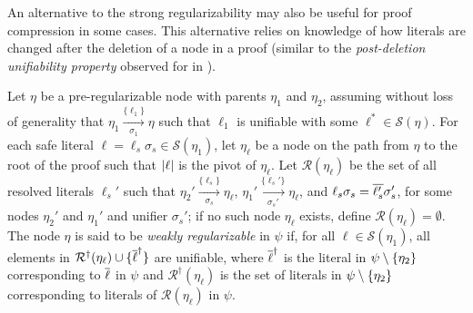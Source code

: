 An alternative to the strong regularizability may also be useful for proof compression in some cases. This alternative relies on knowledge of how literals are changed after the deletion of a node in a proof (similar to the \emph{post-deletion unifiability property} observed for {\FOLowerUnits} in \cite{GFOLU}).  
\begin{definition}\label{def:postdelprop}
Let $\eta$ be a pre-regularizable node with parents $\eta_1$ and $\eta_2$, assuming without loss of generality that $\eta_1 \xrightarrow[\sigma_1]{\{\ell_1\} } \eta$ 
such that $\ell_1$ is unifiable with some $\ell^* \in \mathcal{S}(\eta)$.
For each safe literal $\ell = \ell_s\sigma_s \in \mathcal{S}(\eta_1)$, let $\eta_\ell$ be a node on the path from $\eta$ to the root of the proof such that $\lvert\ell\rvert$ is the pivot of $\eta_\ell$.
Let $\mathcal{R}(\eta_\ell)$ be the set of all resolved literals $\ell_s'$ such that $\eta_2' \xrightarrow[\sigma_s]{\{\ell_s\} } \eta_\ell$, $\eta_1' \xrightarrow[\sigma_s']{\{\ell_s'\} } \eta_\ell$, and $\ell_s\sigma_s=\overline{\ell_s'}\sigma_s'$, for some nodes $\eta_2'$ and $\eta_1'$ and unifier $\sigma_s'$; if no such node $\eta_\ell$ exists, define $\mathcal{R}(\eta_\ell)=\emptyset$.
The node $\eta$ is said to be \emph{weakly regularizable} in $\psi$ if, for all $\ell \in \mathcal{S}(\eta_1)$, all elements in $\mathcal{R}^{\dagger}(\eta_\ell) \cup \{ \overline{\ell}^\dagger \}$ are unifiable, where $\overline{\ell}^{\dagger}$ is the literal in $\psi \setminus \{\eta_2\}$ corresponding to $\overline{\ell}$ in $\psi$ and $\mathcal{R}^{\dagger}(\eta_\ell)$ is the set of literals in $\psi \setminus \{\eta_2\}$ corresponding to literals of $\mathcal{R}(\eta_\ell)$ in $\psi$.
\end{definition}





